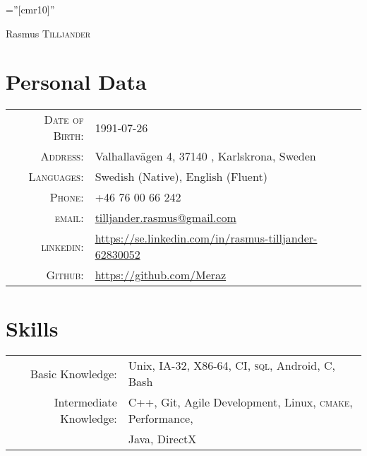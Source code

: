 \documentclass[a4paper,10pt]{article}
\begin{document}

\pagestyle{empty} %

\font\fb=''[cmr10]'' %

\par{\centering
		{\Huge Rasmus \textsc{Tilljander}
	}\bigskip\par}

\section{Personal Data}

\begin{tabular}{rl}
    \textsc{Date of Birth:} &  1991-07-26   \\
    \textsc{Address:}   & Valhallavägen 4, 37140 , Karlskrona, Sweden \\
    \textsc{Languages:}  & Swedish (Native), English (Fluent) \\
    \textsc{Phone:}     & +46 76 00 66 242\\
    \textsc{email:}     & \href{mailto:tilljander.rasmus@gmail.com}{tilljander.rasmus@gmail.com}\\
    \textsc{linkedin:}  & \url{https://se.linkedin.com/in/rasmus-tilljander-62830052}\\
    \textsc{Github:}  & \url{https://github.com/Meraz}
\end{tabular}

\section{Skills}
\begin{tabular}{rl}
Basic Knowledge:& Unix, IA-32, X86-64, CI, \textsc{sql}, Android, C, Bash \setmainfont[SmallCapsFont=Fontin-SmallCaps.otf]{Fontin.otf}\\
Intermediate Knowledge:& \textsc{C++}, Git, Agile Development, Linux, \textsc{cmake}, Performance,\\&  Java, DirectX\\
\end{tabular}
\end{document}
